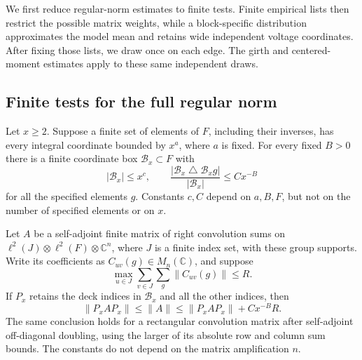 We first reduce regular-norm estimates to finite tests. Finite empirical
lists then restrict the possible matrix weights, while a block-specific
distribution approximates the model mean and retains wide independent
voltage coordinates. After fixing those lists, we draw once on each
edge. The girth and centered-moment estimates apply to these same
independent draws.

\subsection{Finite tests for the full regular norm}

\begin{lemma}\label{sam:boxes}
Let \(x\ge2\).  Suppose a finite set of elements of \(F\), including
their inverses, has every integral coordinate bounded by \(x^a\), where
\(a\) is fixed.  For every fixed \(B>0\) there is a finite coordinate
box \(\mathcal B_x\subset F\) with
\[
 |\mathcal B_x|\le x^{c},\qquad
 \frac{|\mathcal B_x\mathbin\triangle\mathcal B_x g|}
 {|\mathcal B_x|}\le Cx^{-B}
\]
for all the specified elements \(g\).  Constants \(c,C\) depend on
\(a,B,F\), but not on the number of specified elements or on \(x\).

Let \(A\) be a self-adjoint finite matrix of right convolution sums on
\(\ell^2(J)\otimes\ell^2(F)\otimes\mathbb C^n\), where \(J\) is a
finite index set, with these group supports.  Write its coefficients as
\(C_{uv}(g)\in M_n(\mathbb C)\), and suppose
\[
 \max_{u\in J}\sum_{v\in J}\sum_g\|C_{uv}(g)\|\le R.
\]
If \(P_x\) retains the deck indices in \(\mathcal B_x\) and all the
other indices, then
\begin{equation}\label{sam:finite-test}
 \|P_xAP_x\|\le\|A\|
 \le\|P_xAP_x\|+Cx^{-B}R.
\end{equation}
The same conclusion holds for a rectangular convolution matrix after
self-adjoint off-diagonal doubling, using the larger of its absolute
row and column sum bounds.  The constants do not depend on the matrix
amplification \(n\).
\end{lemma}

